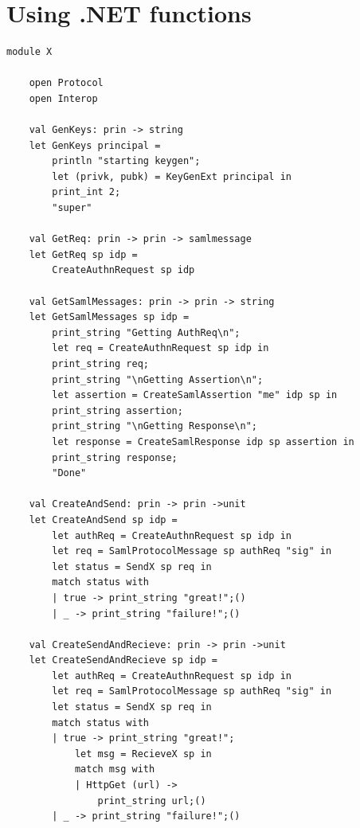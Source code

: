 \documentclass[twosided]{report}
\begin{document}
\section{Using .NET functions}
\begin{lstlisting}[style=fstar, caption={[Example of how use types from .NET]Example of how use types from .NET \cite{jacob}.}]
	module X

	open Protocol
	open Interop
	
	val GenKeys: prin -> string
	let GenKeys principal = 
		println "starting keygen";
		let (privk, pubk) = KeyGenExt principal in
		print_int 2;
		"super"
	
	val GetReq: prin -> prin -> samlmessage
	let GetReq sp idp = 
		CreateAuthnRequest sp idp
		
	val GetSamlMessages: prin -> prin -> string
	let GetSamlMessages sp idp = 
		print_string "Getting AuthReq\n";
		let req = CreateAuthnRequest sp idp in
		print_string req;
		print_string "\nGetting Assertion\n";
		let assertion = CreateSamlAssertion "me" idp sp in
		print_string assertion;
		print_string "\nGetting Response\n";
		let response = CreateSamlResponse idp sp assertion in
		print_string response;
		"Done"
	
	val CreateAndSend: prin -> prin ->unit
	let CreateAndSend sp idp =
		let authReq = CreateAuthnRequest sp idp in
		let req = SamlProtocolMessage sp authReq "sig" in
		let status = SendX sp req in
		match status with
		| true -> print_string "great!";()
		| _ -> print_string "failure!";()
	
	val CreateSendAndRecieve: prin -> prin ->unit
	let CreateSendAndRecieve sp idp =
		let authReq = CreateAuthnRequest sp idp in
		let req = SamlProtocolMessage sp authReq "sig" in
		let status = SendX sp req in
		match status with
		| true -> print_string "great!";
			let msg = RecieveX sp in
			match msg with
			| HttpGet (url) -> 
				print_string url;()
		| _ -> print_string "failure!";()
\end{lstlisting}
\clearpage
\end{document}
